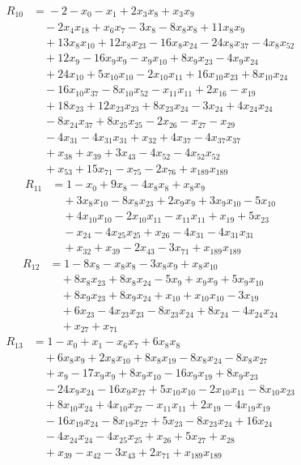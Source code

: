 \begin{align*}
R_{10}&={}-2 -x_{0} -x_{1} +2x_{3}x_{8} +x_{3}x_{9}\\
&\quad{}-2x_{4}x_{18} +x_{6}x_{7} -3x_{8} -8x_{8}x_{8} +11x_{8}x_{9}\\
&\quad{}+13x_{8}x_{10} +12x_{8}x_{23} -16x_{8}x_{24} -24x_{8}x_{37} -4x_{8}x_{52}\\
&\quad{}+12x_{9} -16x_{9}x_{9} -x_{9}x_{10} +8x_{9}x_{23} -4x_{9}x_{24}\\
&\quad{}+24x_{10} +5x_{10}x_{10} -2x_{10}x_{11} +16x_{10}x_{23} +8x_{10}x_{24}\\
&\quad{}-16x_{10}x_{37} -8x_{10}x_{52} -x_{11}x_{11} +2x_{16} -x_{19}\\
&\quad{}+18x_{23} +12x_{23}x_{23} +8x_{23}x_{24} -3x_{24} +4x_{24}x_{24}\\
&\quad{}-8x_{24}x_{37} +8x_{25}x_{25} -2x_{26} -x_{27} -x_{29}\\
&\quad{}-4x_{31} -4x_{31}x_{31} +x_{32} +4x_{37} -4x_{37}x_{37}\\
&\quad{}+x_{38} +x_{39} +3x_{43} -4x_{52} -4x_{52}x_{52}\\
&\quad{}+x_{53} +15x_{71} -x_{75} -2x_{76} +x_{189}x_{189}
\end{align*}
\begin{align*}
R_{11}&={}1 -x_{0} +9x_{8} -4x_{8}x_{8} +x_{8}x_{9}\\
&\quad{}+3x_{8}x_{10} -8x_{8}x_{23} +2x_{9}x_{9} +3x_{9}x_{10} -5x_{10}\\
&\quad{}+4x_{10}x_{10} -2x_{10}x_{11} -x_{11}x_{11} +x_{19} +5x_{23}\\
&\quad{}-x_{24} -4x_{25}x_{25} +x_{26} -4x_{31} -4x_{31}x_{31}\\
&\quad{}+x_{32} +x_{39} -2x_{43} -3x_{71} +x_{189}x_{189}
\end{align*}
\begin{align*}
R_{12}&={}1 -8x_{8} -x_{8}x_{8} -3x_{8}x_{9} +x_{8}x_{10}\\
&\quad{}+8x_{8}x_{23} +8x_{8}x_{24} -5x_{9} +x_{9}x_{9} +5x_{9}x_{10}\\
&\quad{}+8x_{9}x_{23} +8x_{9}x_{24} +x_{10} +x_{10}x_{10} -3x_{19}\\
&\quad{}+6x_{23} -4x_{23}x_{23} -8x_{23}x_{24} +8x_{24} -4x_{24}x_{24}\\
&\quad{}+x_{27} +x_{71}
\end{align*}
\begin{align*}
R_{13}&={}1 -x_{0} +x_{1} -x_{6}x_{7} +6x_{8}x_{8}\\
&\quad{}+6x_{8}x_{9} +2x_{8}x_{10} +8x_{8}x_{19} -8x_{8}x_{24} -8x_{8}x_{27}\\
&\quad{}+x_{9} -17x_{9}x_{9} +8x_{9}x_{10} -16x_{9}x_{19} +8x_{9}x_{23}\\
&\quad{}-24x_{9}x_{24} -16x_{9}x_{27} +5x_{10}x_{10} -2x_{10}x_{11} -8x_{10}x_{23}\\
&\quad{}+8x_{10}x_{24} +4x_{10}x_{27} -x_{11}x_{11} +2x_{19} -4x_{19}x_{19}\\
&\quad{}-16x_{19}x_{24} -8x_{19}x_{27} +5x_{23} -8x_{23}x_{24} +16x_{24}\\
&\quad{}-4x_{24}x_{24} -4x_{25}x_{25} +x_{26} +5x_{27} +x_{28}\\
&\quad{}+x_{39} -x_{42} -3x_{43} +2x_{71} +x_{189}x_{189}
\end{align*}
